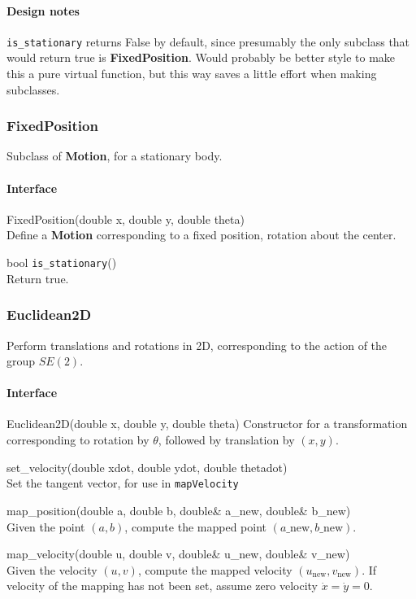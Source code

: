 \documentclass[11pt]{article}
\def\class#1{{\bf #1}} %
\def\fn#1{{\tt #1}} %
\begin{document}
\paragraph{Design notes}
\fn{is\_stationary} returns False by default, since presumably the only subclass that would return true is \class{FixedPosition}.  Would probably be better style to make this a pure virtual function, but this way saves a little effort when making subclasses.

\subsubsection{FixedPosition}
Subclass of \class{Motion}, for a stationary body.

\paragraph{Interface}
\begin{description}
	\item FixedPosition(double x, double y, double theta) \\
		Define a \class{Motion} corresponding to a fixed position, rotation about the center.
	\item bool \fn{is\_stationary}()\\
		Return true.
\end{description}
	

\subsubsection{Euclidean2D}
Perform translations and rotations in 2D, corresponding to the action of the group $SE(2)$.

\paragraph{Interface}
\begin{description}
	\item Euclidean2D(double x, double y, double theta)
		Constructor for a transformation corresponding to rotation by $\theta$, followed by translation by $(x,y)$.
	\item set\_velocity(double xdot, double ydot, double thetadot) \\
		Set the tangent vector, for use in \fn{mapVelocity}
	\item map\_position(double a, double b, double\& a\_new, double\& b\_new)\\
		Given the point $(a,b)$, compute the mapped point $(a\_\text{new},b\_\text{new})$.
	\item map\_velocity(double u, double v, double\& u\_new, double\& v\_new)\\
		Given the velocity $(u,v)$, compute the mapped velocity $(u_\text{new},v_\text{new})$.  If velocity of the mapping has not been set, assume zero velocity $\dot x = \dot y = 0$.
\end{description}
\end{document}
